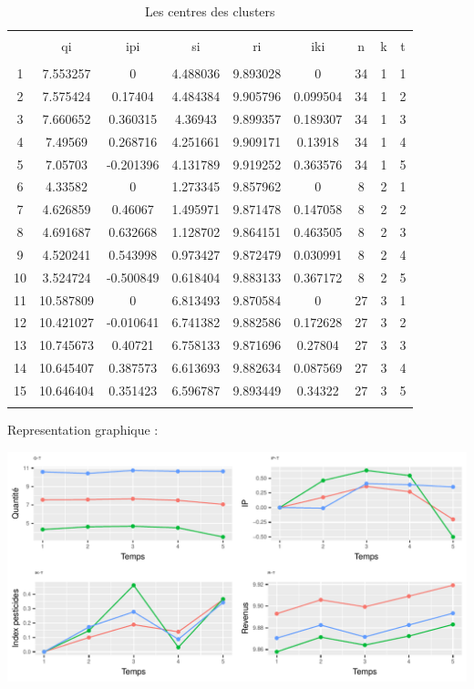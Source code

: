 \documentclass[11pt,]{article}
\begin{document}
\begin{table}[!htbp] \centering 
  \caption{Les centres des clusters} 
  \label{} 
\begin{tabular}{@{\extracolsep{5pt}} ccccccccc} 
\\[-1.8ex]\hline 
\hline \\[-1.8ex] 
 & qi & ipi & si & ri & iki & n & k & t \\ 
\hline \\[-1.8ex] 
1 & 7.553257 & 0 & 4.488036 & 9.893028 & 0 & 34 & 1 & 1 \\ 
2 & 7.575424 & 0.17404 & 4.484384 & 9.905796 & 0.099504 & 34 & 1 & 2 \\ 
3 & 7.660652 & 0.360315 & 4.36943 & 9.899357 & 0.189307 & 34 & 1 & 3 \\ 
4 & 7.49569 & 0.268716 & 4.251661 & 9.909171 & 0.13918 & 34 & 1 & 4 \\ 
5 & 7.05703 & -0.201396 & 4.131789 & 9.919252 & 0.363576 & 34 & 1 & 5 \\ 
6 & 4.33582 & 0 & 1.273345 & 9.857962 & 0 & 8 & 2 & 1 \\ 
7 & 4.626859 & 0.46067 & 1.495971 & 9.871478 & 0.147058 & 8 & 2 & 2 \\ 
8 & 4.691687 & 0.632668 & 1.128702 & 9.864151 & 0.463505 & 8 & 2 & 3 \\ 
9 & 4.520241 & 0.543998 & 0.973427 & 9.872479 & 0.030991 & 8 & 2 & 4 \\ 
10 & 3.524724 & -0.500849 & 0.618404 & 9.883133 & 0.367172 & 8 & 2 & 5 \\ 
11 & 10.587809 & 0 & 6.813493 & 9.870584 & 0 & 27 & 3 & 1 \\ 
12 & 10.421027 & -0.010641 & 6.741382 & 9.882586 & 0.172628 & 27 & 3 & 2 \\ 
13 & 10.745673 & 0.40721 & 6.758133 & 9.871696 & 0.27804 & 27 & 3 & 3 \\ 
14 & 10.645407 & 0.387573 & 6.613693 & 9.882634 & 0.087569 & 27 & 3 & 4 \\ 
15 & 10.646404 & 0.351423 & 6.596787 & 9.893449 & 0.34322 & 27 & 3 & 5 \\ 
\hline \\[-1.8ex] 
\end{tabular} 
\end{table}

Representation graphique :

\includegraphics{note2pres_files/figure-latex/unnamed-chunk-97-1.pdf}
\end{document}
